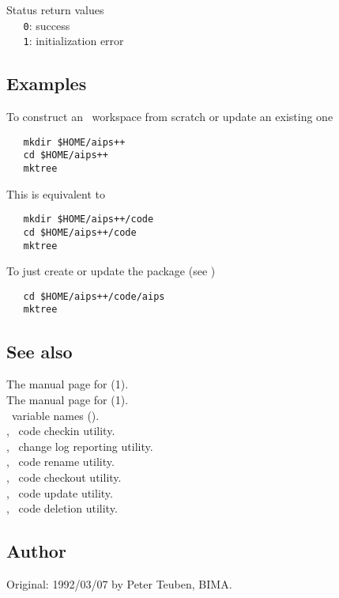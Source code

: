 Status return values
\\ \verb+   0+: success
\\ \verb+   1+: initialization error

\subsection*{Examples}

To construct an \aipspp\ workspace from scratch or update an existing one

\begin{verbatim}
   mkdir $HOME/aips++
   cd $HOME/aips++
   mktree
\end{verbatim}

\noindent
This is equivalent to

\begin{verbatim}
   mkdir $HOME/aips++/code
   cd $HOME/aips++/code
   mktree
\end{verbatim}

\noindent
To just create or update the  package (see )

\begin{verbatim}
   cd $HOME/aips++/code/aips
   mktree
\end{verbatim}

\subsection*{See also}

The manual page for (1).\\
The manual page for (1).\\
\aipspp\ variable names ().\\
, \aipspp\ code checkin utility.\\
, \aipspp\ change log reporting utility.\\
, \aipspp\ code rename utility.\\
, \aipspp\ code checkout utility.\\
, \aipspp\ code update utility.\\
, \aipspp\ code deletion utility.

\subsection*{Author}

Original: 1992/03/07 by Peter Teuben, BIMA.
 
